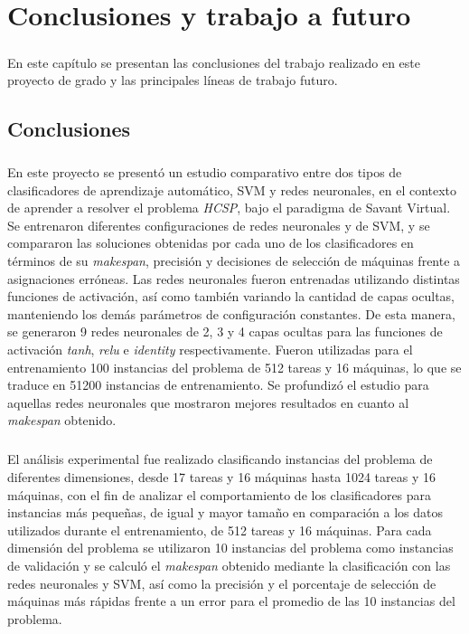 \chapter{Conclusiones y trabajo a futuro} \label{section-conclusiones}

\paragraph{}En este capítulo se presentan las conclusiones del trabajo realizado en este proyecto de grado y las principales líneas de trabajo futuro.

\section{Conclusiones}

\paragraph{}En este proyecto se presentó un estudio comparativo entre dos tipos de clasificadores de aprendizaje automático, SVM y redes neuronales, en el contexto de aprender a resolver el problema \textit{HCSP}, bajo el paradigma de Savant Virtual.
Se entrenaron diferentes configuraciones de redes neuronales y de SVM, y se compararon las soluciones obtenidas por cada uno de los clasificadores en términos de su \textit{makespan}, precisión y decisiones de selección de máquinas frente a asignaciones erróneas.
Las redes neuronales fueron entrenadas utilizando distintas funciones de activación, así como también variando la cantidad de capas ocultas, manteniendo los demás parámetros de configuración constantes.
De esta manera, se generaron 9 redes neuronales de 2, 3 y 4 capas ocultas para las funciones de activación \textit{tanh}, \textit{relu} e \textit{identity} respectivamente.
Fueron utilizadas para el entrenamiento 100 instancias del problema de 512 tareas y 16 máquinas, lo que se traduce en 51200 instancias de entrenamiento.
Se profundizó el estudio para aquellas redes neuronales que mostraron mejores resultados en cuanto al \textit{makespan} obtenido.

\paragraph{}El análisis experimental fue realizado clasificando instancias del problema de diferentes dimensiones, desde 17 tareas y 16 máquinas hasta 1024 tareas y 16 máquinas, con el fin de analizar el comportamiento de los clasificadores para instancias más pequeñas, de igual y mayor tamaño en comparación a los datos utilizados durante el entrenamiento, de 512 tareas y 16 máquinas.
Para cada dimensión del problema se utilizaron 10 instancias del problema como instancias de validación y se calculó el \textit{makespan} obtenido mediante la clasificación con las redes neuronales y SVM, así como la precisión y el porcentaje de selección de máquinas más rápidas frente a un error para el promedio de las 10 instancias del problema.

